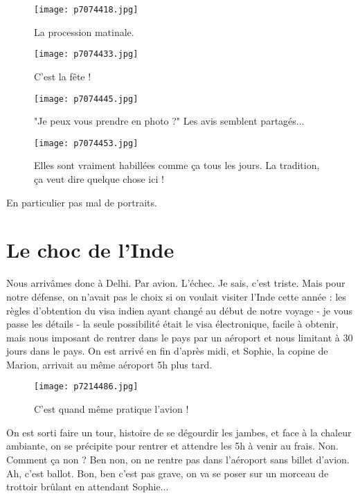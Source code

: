 \documentclass{book}
\begin{document}
\begin{figure}[h]
\centering
\texttt{[image: p7074418.jpg]}
\caption*{La procession matinale.}
\end{figure}


\begin{figure}[h]
\centering
\texttt{[image: p7074433.jpg]}
\caption*{C'est la fête !}
\end{figure}


\begin{figure}[h]
\centering
\texttt{[image: p7074445.jpg]}
\caption*{"Je peux vous prendre en photo ?" Les avis semblent partagés...}
\end{figure}


\begin{figure}[h]
\centering
\texttt{[image: p7074453.jpg]}
\caption*{Elles sont vraiment habillées comme ça tous les jours. La tradition, ça veut dire quelque chose ici !}
\end{figure}

 En particulier pas mal de portraits.

\chapter{Le choc de l'Inde}
Nous arrivâmes donc à Delhi. Par avion. L'échec. Je sais, c'est triste. Mais pour notre défense, on n'avait pas le choix si on voulait visiter l'Inde cette année : les règles d'obtention du visa indien ayant changé au début de notre voyage - je vous passe les détails - la seule possibilité était le visa électronique, facile à obtenir, mais nous imposant de rentrer dans le pays par un aéroport et nous limitant à 30 jours dans le pays. On est arrivé en fin d'après midi, et Sophie, la copine de Marion, arrivait au même aéroport 5h plus tard.


\begin{figure}[h]
\centering
\texttt{[image: p7214486.jpg]}
\caption*{C'est quand même pratique l'avion !}
\end{figure}

On est sorti faire un tour, histoire de se dégourdir les jambes, et face à la chaleur ambiante, on se précipite pour rentrer et attendre les 5h à venir au frais. Non. Comment ça non ? Ben non, on ne rentre pas dans l'aéroport sans billet d'avion. Ah, c'est ballot. Bon, ben c'est pas grave, on va se poser sur un morceau de trottoir brûlant en attendant Sophie...
\end{document}
